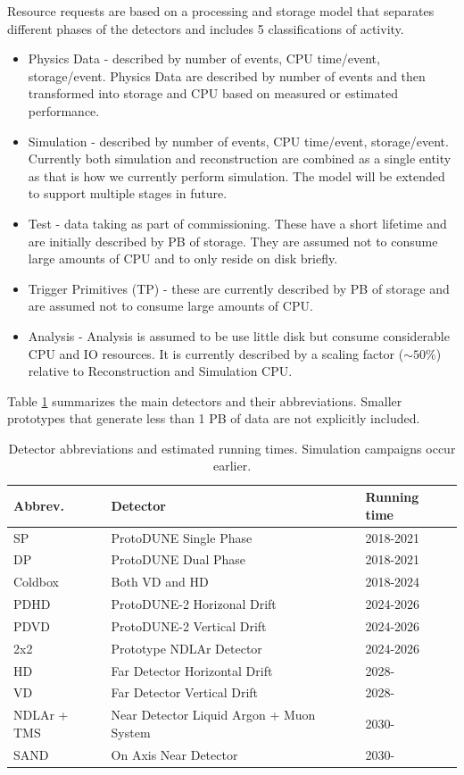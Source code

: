 \documentclass[12pt]{article}
\begin{document}
Resource requests are based on a processing and storage model that separates different phases of the detectors and includes 5 classifications of activity.

\begin{itemize}
\item Physics Data - described by number of events, CPU time/event, storage/event.  Physics Data are described by number of events and then transformed into storage and CPU based on measured or estimated performance. 
\item Simulation - described by number of events,  CPU time/event, storage/event.  Currently both simulation and reconstruction are combined as a single entity as that is how we currently perform simulation.  The model will be extended to support multiple stages in future. 
\item Test - data taking as part of commissioning.  These have a short lifetime and are initially described by PB of storage. They are assumed not to consume large amounts of CPU and to only reside on disk briefly. 
\item Trigger Primitives (TP) -  these are currently described by PB of storage and are assumed not to consume large amounts of CPU.  
\item Analysis - Analysis is assumed to be use little disk but consume considerable CPU and IO resources.  It is currently described by a scaling factor ($\sim 50\%$) relative to Reconstruction and Simulation CPU.
\end{itemize}

 Table \ref{tab:detectors} summarizes the main detectors and their abbreviations. Smaller prototypes that generate less than 1 PB of data  are not explicitly included. 

\begin{table}[h]
\begin{centering}
  \begin{tabular}{|l|l|l|}
     \hline
    Abbrev. & Detector & Running time\\
    \hline
    SP & ProtoDUNE Single Phase & 2018-2021\\
    DP & ProtoDUNE Dual Phase & 2018-2021\\
    Coldbox & Both VD and HD & 2018-2024\\
    PDHD & ProtoDUNE-2 Horizonal Drift & 2024-2026\\
    PDVD & ProtoDUNE-2 Vertical Drift & 2024-2026\\
    2x2& Prototype NDLAr Detector & 2024-2026\\
    HD & Far Detector Horizontal Drift & 2028-\\
    VD & Far Detector Vertical Drift & 2028-\\
    NDLAr + TMS & Near Detector Liquid Argon + Muon System & 2030-\\
    SAND & On Axis Near Detector & 2030- \\
     \hline
     \end{tabular}
       \caption{Detector abbreviations and estimated running times.  Simulation campaigns occur earlier. }\label{tab:detectors}
  \end{centering}
   
     \end{table}
     
\end{document}
